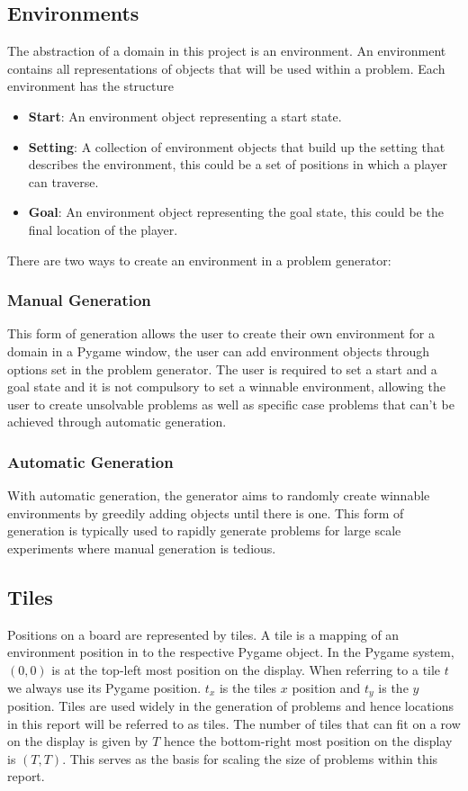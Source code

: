 \subsection{Environments}
The abstraction of a domain in this project is an environment. An environment contains all representations of objects that will be used within a problem. Each environment has the structure
\begin{itemize}
    \item \textbf{Start}: An environment object representing a start state.
    \item \textbf{Setting}: A collection of environment objects that build up the setting that describes the environment, this could be a set of positions in which a player can traverse.
    \item \textbf{Goal}: An environment object representing the goal state, this could be the final location of the player.
\end{itemize}
There are two ways to create an environment in a problem generator:

\subsubsection{Manual Generation}
This form of generation allows the user to create their own environment for a domain in a Pygame window, the user can add environment objects through options set in the problem generator. The user is required to set a start and a goal state and it is not compulsory to set a winnable environment, allowing the user to create unsolvable problems as well as specific case problems that can't be achieved through automatic generation.

\subsubsection{Automatic Generation}
With automatic generation, the generator aims to randomly create winnable environments by greedily adding objects until there is one. This form of generation is typically used to rapidly generate problems for large scale experiments where manual generation is tedious.

\subsection{Tiles}
Positions on a board are represented by tiles. A tile is a mapping of an environment position in to the respective Pygame object. In the Pygame system, $(0, 0)$ is at the top-left most position on the display. When referring to a tile $t$ we always use its Pygame position. $t_x$ is the tiles $x$ position and $t_y$ is the $y$ position. Tiles are used widely in the generation of problems and hence locations in this report will be referred to as tiles. The number of tiles that can fit on a row on the display is given by $T$ hence the bottom-right most position on the display is $(T, T)$. This serves as the basis for scaling the size of problems within this report.

